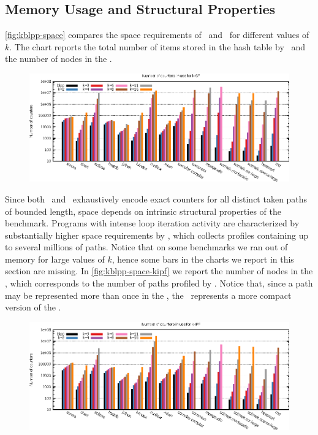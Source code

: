 \subsection{Memory Usage and Structural Properties}
\myfigure\ref{fig:kblpp-space} compares the space requirements of \blpp\ and \kblpp\ for different values of $k$. The chart reports the total number of items stored in the hash table by \blpp\ and the number of nodes in the \ksf.

\ifdefined\noauthorea
\begin{figure}[!ht]
\begin{center}
\includegraphics[width=\textwidth]{figures/kblpp-space/kblpp-space.eps}
\caption{\protect}
\end{center}
\end{figure}
\fi

Since both \blpp\ and \kblpp\ exhaustively encode exact counters for all distinct taken paths of bounded length, space depends on intrinsic structural properties of the benchmark. Programs with intense loop iteration activity are characterized by substantially higher space requirements by \kblpp, which collects profiles containing up to several millions of paths. Notice that on some benchmarks we ran out of memory for large values of $k$, hence some bars in the charts we report in this section are missing. In \myfigure\ref{fig:kblpp-space-kipf} we report the number of nodes in the \kipf, which corresponds to the number of paths profiled by \kblpp. Notice that, since a path may be represented more than once in the \ksf, the \kipf\ represents a more compact version of the \ksf.

\ifdefined\noauthorea
\begin{figure}[!ht]
\begin{center}
\includegraphics[width=\textwidth]{figures/kblpp-space-kipf/kblpp-space-kipf.eps}
\caption{\protect}
\end{center}
\end{figure}
\fi


